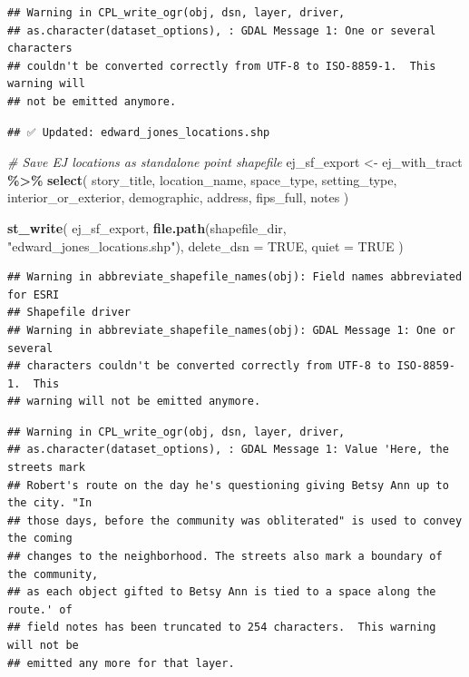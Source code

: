 \documentclass[
]{article}
\newenvironment{Shaded}{\begin{snugshade}}{\end{snugshade}}
\newcommand{\AttributeTok}[1]{\textcolor[rgb]{0.13,0.29,0.53}{#1}}
\newcommand{\CommentTok}[1]{\textcolor[rgb]{0.56,0.35,0.01}{\textit{#1}}}
\newcommand{\ConstantTok}[1]{\textcolor[rgb]{0.56,0.35,0.01}{#1}}
\newcommand{\FunctionTok}[1]{\textcolor[rgb]{0.13,0.29,0.53}{\textbf{#1}}}
\newcommand{\NormalTok}[1]{#1}
\newcommand{\OtherTok}[1]{\textcolor[rgb]{0.56,0.35,0.01}{#1}}
\newcommand{\SpecialCharTok}[1]{\textcolor[rgb]{0.81,0.36,0.00}{\textbf{#1}}}
\newcommand{\StringTok}[1]{\textcolor[rgb]{0.31,0.60,0.02}{#1}}
\begin{document}
\begin{verbatim}
## Warning in CPL_write_ogr(obj, dsn, layer, driver,
## as.character(dataset_options), : GDAL Message 1: One or several characters
## couldn't be converted correctly from UTF-8 to ISO-8859-1.  This warning will
## not be emitted anymore.
\end{verbatim}

\begin{verbatim}
## ✅ Updated: edward_jones_locations.shp
\end{verbatim}

\begin{Shaded}
\begin{Highlighting}[]
\CommentTok{\# Save EJ locations as standalone point shapefile}
\NormalTok{ej\_sf\_export }\OtherTok{\textless{}{-}}\NormalTok{ ej\_with\_tract }\SpecialCharTok{\%\textgreater{}\%}
  \FunctionTok{select}\NormalTok{(}
\NormalTok{    story\_title,}
\NormalTok{    location\_name,}
\NormalTok{    space\_type,}
\NormalTok{    setting\_type,}
\NormalTok{    interior\_or\_exterior,}
\NormalTok{    demographic,}
\NormalTok{    address,}
\NormalTok{    fips\_full,}
\NormalTok{    notes}
\NormalTok{  )}

\FunctionTok{st\_write}\NormalTok{(}
\NormalTok{  ej\_sf\_export,}
  \FunctionTok{file.path}\NormalTok{(shapefile\_dir, }\StringTok{"edward\_jones\_locations.shp"}\NormalTok{),}
  \AttributeTok{delete\_dsn =} \ConstantTok{TRUE}\NormalTok{,}
  \AttributeTok{quiet =} \ConstantTok{TRUE}
\NormalTok{)}
\end{Highlighting}
\end{Shaded}

\begin{verbatim}
## Warning in abbreviate_shapefile_names(obj): Field names abbreviated for ESRI
## Shapefile driver
## Warning in abbreviate_shapefile_names(obj): GDAL Message 1: One or several
## characters couldn't be converted correctly from UTF-8 to ISO-8859-1.  This
## warning will not be emitted anymore.
\end{verbatim}

\begin{verbatim}
## Warning in CPL_write_ogr(obj, dsn, layer, driver,
## as.character(dataset_options), : GDAL Message 1: Value 'Here, the streets mark
## Robert's route on the day he's questioning giving Betsy Ann up to the city. "In
## those days, before the community was obliterated" is used to convey the coming
## changes to the neighborhood. The streets also mark a boundary of the community,
## as each object gifted to Betsy Ann is tied to a space along the route.' of
## field notes has been truncated to 254 characters.  This warning will not be
## emitted any more for that layer.
\end{verbatim}
\end{document}
